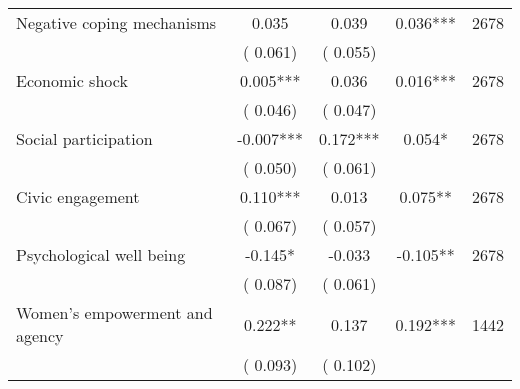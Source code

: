\begin{tabular}{l*{4}{c}}
 Negative coping mechanisms &              0.035 &         0.039 &           0.036*** & 2678                       \\  
                 &        (       0.061)                   &        (       0.055)                        &                                                             &                                                      \\      

 Economic shock &              0.005*** &         0.036 &           0.016*** & 2678                       \\  
                 &        (       0.046)                   &        (       0.047)                        &                                                             &                                                      \\      

 Social participation &             -0.007*** &         0.172*** &           0.054* & 2678                       \\  
                 &        (       0.050)                   &        (       0.061)                        &                                                             &                                                      \\      

 Civic engagement &              0.110*** &         0.013 &           0.075** & 2678                       \\  
                 &        (       0.067)                   &        (       0.057)                        &                                                             &                                                      \\      

 Psychological well being &             -0.145* &        -0.033 &          -0.105** & 2678                       \\  
                 &        (       0.087)                   &        (       0.061)                        &                                                             &                                                      \\      

 Women's empowerment and agency &              0.222** &         0.137 &           0.192*** & 1442                       \\  
                 &        (       0.093)                   &        (       0.102)                        &                                                             &                                                      \\      


\end{tabular}
